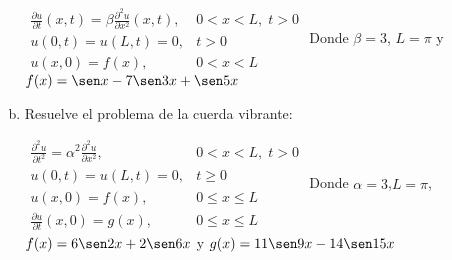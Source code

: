 \documentclass[12pt]{exam}
\begin{document}
\begin{questions}
\begin{enumerate}[a)]
         $\begin{array}{ll}
              \frac{\partial u}{\partial t}(x,t)=\beta\frac{\partial^2u}{\partial x^2}(x,t),&0<x<L,\;t>0  \\
              u(0,t)=u(L,t)=0,&t>0\\
              u(x,0)=f(x),&0<x<L
         \end{array}$
         \vskip10pt
         Donde $\beta=3$, $L=\pi$ y $f(x)=\sen x-7\sen3x+\sen5x$
         \newpage
         \item Resuelve el problema de la cuerda vibrante:
         
         $\begin{array}{ll}
              \frac{\partial^2u}{\partial t^2}=\alpha^2\frac{\partial^2u}{\partial x^2},&0<x<L,\;t>0  \\
              u(0,t)=u(L,t)=0,&t\geq0\\
              u(x,0)=f(x),&0\leq x\leq L\\
              \frac{\partial u}{\partial t}(x,0)=g(x),&0\leq x\leq L\
         \end{array}$
         \vskip10pt
         Donde $\alpha=3$,$L=\pi$, $f(x)=6\sen2x+2\sen6x$ y $g(x)=11\sen9x-14\sen15x$
     \end{enumerate}
     

        \end{questions}
\end{document}
